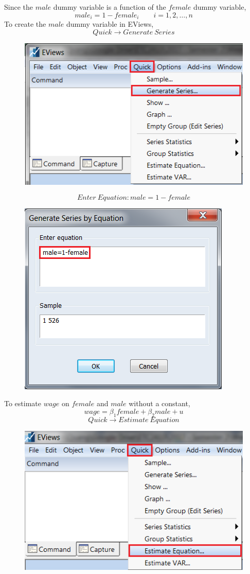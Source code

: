 \documentclass[12pt]{report}
\begin{document}
\noindent Since the $male$ dummy variable is a function of the $female$ dummy variable,
$$
male_i = 1-female_i \qquad i = 1,2,\dots,n
$$
\noindent To create the $male$ dummy variable in EViews,
$$Quick \to Generate\ Series$$
\begin{figure}[H]
	\centering
	\includegraphics{q2_3}
\end{figure}
\vspace{-\baselineskip}
$$Enter\ Equation: male=1-female$$
\begin{figure}[H]
	\centering
	\includegraphics{q2_4}
\end{figure}
\vspace{-\baselineskip}
\noindent To estimate $wage$ on $female$ and $male$ without a constant, 
$$wage = \beta_1female +\beta_2male + u$$
$$Quick \to Estimate\ Equation$$
\begin{figure}[H]
	\centering
	\includegraphics{q1_2}
\end{figure}
\end{document}
